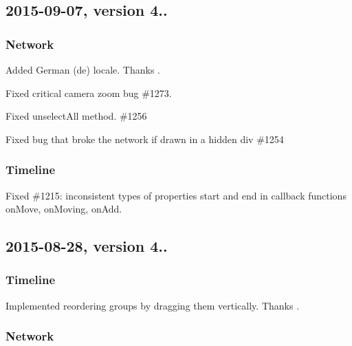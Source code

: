 \subsection*{2015-\/09-\/07, version 4..}

\subsubsection*{Network}


\begin{DoxyItemize}
\item Added German (de) locale. Thanks .
\item Fixed critical camera zoom bug \#1273.
\item Fixed unselect\+All method. \#1256
\item Fixed bug that broke the network if drawn in a hidden div \#1254
\end{DoxyItemize}

\subsubsection*{Timeline}


\begin{DoxyItemize}
\item Fixed \#1215\+: inconsistent types of properties {\ttfamily start} and {\ttfamily end} in callback functions {\ttfamily on\+Move}, {\ttfamily on\+Moving}, {\ttfamily on\+Add}.
\end{DoxyItemize}

\subsection*{2015-\/08-\/28, version 4..}

\subsubsection*{Timeline}


\begin{DoxyItemize}
\item Implemented reordering groups by dragging them vertically. Thanks .
\end{DoxyItemize}

\subsubsection*{Network}


